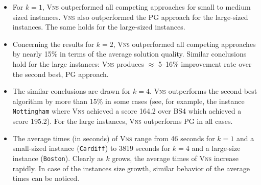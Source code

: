 \documentclass[dvipsnames,format=sigconf]{acmart} %
\begin{document}
\begin{itemize}
  		\item  For $k=1$, \textsc{Vns} outperformed all competing approaches for small to medium sized instances. \textsc{Vns} also outperformed the PG approach for the large-sized instances. {\color{red}The same holds for the large-sized instances. }
  		\item Concerning the results for $k=2$, \textsc{Vns} outperformed all competing approaches by nearly 15\% in terms of the average solution quality. Similar conclusions hold for the large instances: \textsc{Vns} produces $\approx$ 5--16\% improvement rate over the second best, PG approach. 
  		\item The similar {\color{red}conclusions are drawn} for $k=4$. \textsc{Vns} outperforms the second-best algorithm by more than 15\% in some cases (see, for example,  the instance \texttt{Nottingham} where \textsc{Vns} achieved a score 164.2 over BS4 which achieved a score 195.2). For the large instances, \textsc{Vns}   outperforms PG in all cases. 
  		\item {\color{red} The average times (in seconds) of \textsc{Vns}  range from 46 seconds for $k=1$ and a small-sized instance (\texttt{Cardiff}) to 3819 seconds for $k=4$ and a large-size instance (\texttt{Boston}).
         Clearly as $k$ grows, the average times of \textsc{Vns} increase rapidly. In case of the instances size growth, similar behavior of the average times can be noticed. }
\end{itemize}

 
 
\end{document}
